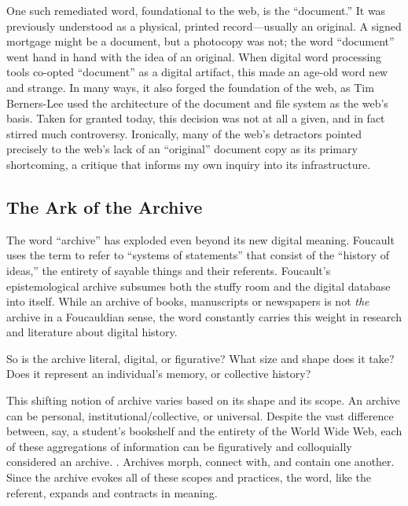 One such remediated word, foundational to the web, is the ``document.'' It was previously understood as a physical, printed record---usually an original. A signed mortgage might be a document, but a photocopy was not; the word ``document'' went hand in hand with the idea of an original. When digital word processing tools co-opted ``document'' as a digital artifact, this made an age-old word new and strange. In many ways, it also forged the foundation of the web, as Tim Berners-Lee used the architecture of the document and file system as the web's basis.\autocite{berners-lee} Taken for granted today, this decision was not at all a given, and in fact stirred much controversy. Ironically, many of the web's detractors pointed precisely to the web's lack of an ``original'' document copy as its primary shortcoming, a critique that informs my own inquiry into its infrastructure.\autocite{nelson_one_liners}

\subsection{The Ark of the Archive}

The word ``archive'' has exploded even beyond its new digital meaning. Foucault uses the term to refer to ``systems of statements'' that consist of the ``history of ideas,'' the entirety of sayable things and their referents.  Foucault’s epistemological archive subsumes both the stuffy room and the digital database into itself. While an archive of books, manuscripts or newspapers is not \emph{the} archive in a Foucauldian sense, the word constantly carries this weight in research and literature about digital history.


So is the archive literal, digital, or figurative? What size and shape does it take? Does it represent an individual’s memory, or collective history?

This shifting notion of archive varies based on its shape and its scope. An archive can be personal, institutional/collective, or universal. Despite the vast difference between, say, a student’s bookshelf and the entirety of the World Wide Web, each of these aggregations of information can be figuratively and colloquially considered an archive. . Archives morph, connect with, and contain one another. Since the archive evokes all of these scopes and practices, the word, like the referent, expands and contracts in meaning.

